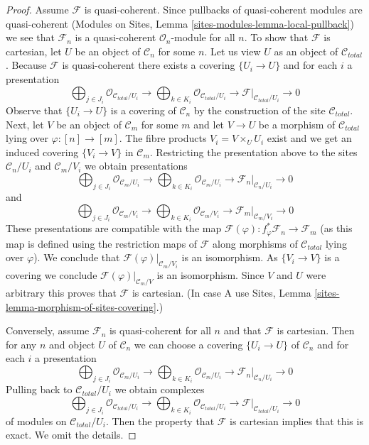 \documentclass{stacks-project}
\theoremstyle{plain}
\theoremstyle{definition}
\theoremstyle{remark}
\numberwithin{equation}{subsection}
\begin{document}
\begin{proof}
Assume $\mathcal{F}$ is quasi-coherent. Since pullbacks of
quasi-coherent modules are quasi-coherent
(Modules on Sites, Lemma \ref{sites-modules-lemma-local-pullback})
we see that $\mathcal{F}_n$ is a quasi-coherent $\mathcal{O}_n$-module
for all $n$. To show that $\mathcal{F}$ is cartesian, let $U$
be an object of $\mathcal{C}_n$ for some $n$. Let us view $U$
as an object of $\mathcal{C}_{total}$. Because $\mathcal{F}$
is quasi-coherent there exists a covering $\{U_i \to U\}$
and for each $i$ a presentation
$$
\bigoplus\nolimits_{j \in J_i} \mathcal{O}_{\mathcal{C}_{total}/U_i} \to
\bigoplus\nolimits_{k \in K_i} \mathcal{O}_{\mathcal{C}_{total}/U_i} \to
\mathcal{F}|_{\mathcal{C}_{total}/U_i} \to 0
$$
Observe that $\{U_i \to U\}$ is a covering of $\mathcal{C}_n$ by
the construction of the site $\mathcal{C}_{total}$.
Next, let $V$ be an object of $\mathcal{C}_m$ for some $m$ and let
$V \to U$ be a morphism of $\mathcal{C}_{total}$ lying over
$\varphi : [n] \to [m]$. The fibre products $V_i = V \times_U U_i$
exist and we get an induced covering $\{V_i \to V\}$ in $\mathcal{C}_m$.
Restricting the presentation above to the sites
$\mathcal{C}_n/U_i$ and $\mathcal{C}_m/V_i$ we obtain
presentations
$$
\bigoplus\nolimits_{j \in J_i} \mathcal{O}_{\mathcal{C}_m/U_i} \to
\bigoplus\nolimits_{k \in K_i} \mathcal{O}_{\mathcal{C}_m/U_i} \to
\mathcal{F}_n|_{\mathcal{C}_n/U_i} \to 0
$$
and
$$
\bigoplus\nolimits_{j \in J_i} \mathcal{O}_{\mathcal{C}_m/V_i} \to
\bigoplus\nolimits_{k \in K_i} \mathcal{O}_{\mathcal{C}_m/V_i} \to
\mathcal{F}_m|_{\mathcal{C}_m/V_i} \to 0
$$
These presentations are compatible with the map
$\mathcal{F}(\varphi) : f_\varphi^*\mathcal{F}_n \to \mathcal{F}_m$
(as this map is defined using the restriction maps of $\mathcal{F}$
along morphisms of $\mathcal{C}_{total}$ lying over $\varphi$).
We conclude that $\mathcal{F}(\varphi)|_{\mathcal{C}_m/V_i}$
is an isomorphism. As $\{V_i \to V\}$ is a covering we conclude
$\mathcal{F}(\varphi)|_{\mathcal{C}_m/V}$ is an isomorphism.
Since $V$ and $U$ were arbitrary this proves that $\mathcal{F}$ is cartesian.
(In case A use Sites, Lemma \ref{sites-lemma-morphism-of-sites-covering}.)

\medskip\noindent
Conversely, assume $\mathcal{F}_n$ is quasi-coherent
for all $n$ and that $\mathcal{F}$ is cartesian.
Then for any $n$ and object $U$ of $\mathcal{C}_n$ we
can choose a covering $\{U_i \to U\}$ of $\mathcal{C}_n$
and for each $i$ a presentation
$$
\bigoplus\nolimits_{j \in J_i} \mathcal{O}_{\mathcal{C}_m/U_i} \to
\bigoplus\nolimits_{k \in K_i} \mathcal{O}_{\mathcal{C}_m/U_i} \to
\mathcal{F}_n|_{\mathcal{C}_n/U_i} \to 0
$$
Pulling back to $\mathcal{C}_{total}/U_i$ we obtain complexes
$$
\bigoplus\nolimits_{j \in J_i} \mathcal{O}_{\mathcal{C}_{total}/U_i} \to
\bigoplus\nolimits_{k \in K_i} \mathcal{O}_{\mathcal{C}_{total}/U_i} \to
\mathcal{F}|_{\mathcal{C}_{total}/U_i} \to 0
$$
of modules on $\mathcal{C}_{total}/U_i$. Then the property that
$\mathcal{F}$ is cartesian implies that this is exact.
We omit the details.
\end{proof}
\end{document}
